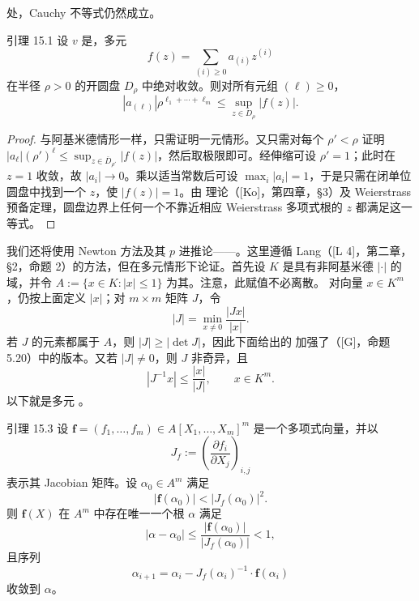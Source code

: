 处，Cauchy 不等式仍然成立。
\begin{statement}{引理 15.1}
设 $v$ 是，多元
\[
f(z)=\sum_{(i)\ge0}a_{(i)}z^{(i)}
\]
在半径 $\rho>0$ 的开圆盘 $D_\rho$ 中绝对收敛。则对所有元组 $(\ell)\ge0$，
\[
|a_{(\ell)}|\rho^{\ell_1+\cdots+\ell_m}\le\sup_{z\in D_\rho}|f(z)|.
\]
\end{statement}
\begin{proof}
与阿基米德情形一样，只需证明一元情形。又只需对每个 $\rho'<\rho$ 证明 $|a_\ell|(\rho')^\ell\le\sup_{z\in\bar D_{\rho'}}|f(z)|$，然后取极限即可。经伸缩可设 $\rho'=1$；此时在 $z=1$ 收敛，故 $|a_i|\to0$。乘以适当常数后可设 $\max_i|a_i|=1$，于是只需在闭单位圆盘中找到一个 $z$，使 $|f(z)|=1$。由 理论（[Ko]，第四章，§3）及 Weierstrass 预备定理，圆盘边界上任何一个不靠近相应 Weierstrass 多项式根的 $z$ 都满足这一等式。
\end{proof}
我们还将使用 Newton 方法及其 $p$ 进推论——。这里遵循 Lang（[L 4]，第二章，§2，命题 2）的方法，但在多元情形下论证。首先设 $K$ 是具有非阿基米德 $|\cdot|$ 的域，并令 $A:=\{x\in K:|x|\le1\}$ 为其。注意，此赋值不必离散。
对向量 $x\in K^m$，仍按上面定义 $|x|$；对 $m\times m$ 矩阵 $J$，令
\[
|J|=\min_{x\ne0}\frac{|Jx|}{|x|}.
\]
若 $J$ 的元素都属于 $A$，则 $|J|\ge|\det J|$，因此下面给出的 加强了（[G]，命题 5.20）中的版本。又若 $|J|\ne0$，则 $J$ 非奇异，且
\begin{equation*}\tag{15.2}
|J^{-1}x|\le\frac{|x|}{|J|},\qquad x\in K^m.
\end{equation*}
以下就是多元 。
\begin{statement}{引理 15.3}
设 $\mathbf f=(f_1,\ldots,f_m)\in A[X_1,\ldots,X_m]^m$ 是一个多项式向量，并以
\[
J_f:=\left(\frac{\partial f_i}{\partial X_j}\right)_{i,j}
\]
表示其 Jacobian 矩阵。设 $\alpha_0\in A^m$ 满足
\begin{equation*}\tag{15.4}
|\mathbf f(\alpha_0)|<|J_f(\alpha_0)|^2.
\end{equation*}
则 $\mathbf f(X)$ 在 $A^m$ 中存在唯一一个根 $\alpha$ 满足
\begin{equation*}\tag{15.5}
|\alpha-\alpha_0|\le\frac{|\mathbf f(\alpha_0)|}{|J_f(\alpha_0)|}<1,
\end{equation*}
且序列
\begin{equation*}\tag{15.6}
\alpha_{i+1}=\alpha_i-J_f(\alpha_i)^{-1}\cdot\mathbf f(\alpha_i)
\end{equation*}
收敛到 $\alpha$。
\end{statement}
